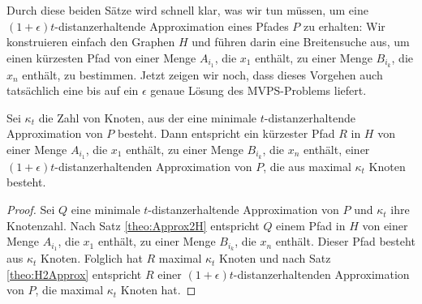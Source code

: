     Durch diese beiden Sätze wird schnell klar, was wir tun müssen, um eine $(1+\epsilon)t$-distanzerhaltende Approximation eines Pfades $P$ zu erhalten: 
    Wir konstruieren einfach den Graphen $H$ und führen darin eine Breitensuche aus, um einen kürzesten Pfad von einer Menge $A_{i_1}$, die $x_1$ enthält, zu einer Menge $B_{i_k}$, die $x_n$ enthält, zu bestimmen. 
    Jetzt zeigen wir noch, dass dieses Vorgehen auch tatsächlich eine bis auf ein $\epsilon$ genaue Lösung des MVPS-Problems liefert.
    
    \begin{theorem}
    	\label{theo:mvpsvertices}
    	Sei $\kappa_t$ die Zahl von Knoten, aus der eine minimale $t$-distanzerhaltende Approximation von $P$ besteht.
    	Dann entspricht ein kürzester Pfad $R$ in $H$ von einer Menge $A_{i_1}$, die $x_1$ enthält, zu einer Menge $B_{i_k}$, die $x_n$ enthält, einer $(1 + \epsilon)t$-distanzerhaltenden Approximation von $P$, die aus maximal $\kappa_t$ Knoten besteht.
    \end{theorem}
    \begin{proof}
    	Sei $Q$ eine minimale $t$-distanzerhaltende Approximation von $P$ und $\kappa_t$ ihre Knotenzahl. 
    	Nach Satz \ref{theo:Approx2H} entspricht $Q$ einem Pfad in $H$ von einer Menge $A_{i_1}$, die $x_1$ enthält, zu einer Menge $B_{i_k}$, die $x_n$ enthält. 
    	Dieser Pfad besteht aus $\kappa_t$ Knoten. 
    	Folglich hat $R$ maximal $\kappa_t$ Knoten und nach Satz \ref{theo:H2Approx} entspricht $R$ einer $(1 + \epsilon)t$-distanzerhaltenden Approximation von $P$, die maximal $\kappa_t$ Knoten hat.
    \end{proof}
    
